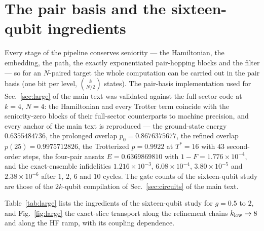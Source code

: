 \documentclass[aps,prc,reprint,superscriptaddress,floatfix,nofootinbib]{revtex4-2}
\begin{document}
\section{The pair basis and the sixteen-qubit ingredients}
\label{sm:large}
Every stage of the pipeline conserves seniority --- the Hamiltonian, the
embedding, the path, the exactly exponentiated pair-hopping blocks and the
filter --- so for an $N$-paired target the whole computation can be carried
out in the pair basis (one bit per level, $\binom{k}{N/2}$ states).  The
pair-basis implementation used for Sec.~\ref{sec:large} of the main text
was validated against the full-sector code at $k=4$, $N=4$: the Hamiltonian
and every Trotter term coincide with the seniority-zero blocks of their
full-sector counterparts to machine precision, and every anchor of the main
text is reproduced --- the ground-state energy $0.6355484736$, the prolonged
overlap $p_0=0.8676375677$, the refined overlap $p(25)=0.9975712826$, the
Trotterized $p=0.9922$ at $T^*=16$ with $43$ second-order steps, the
four-pair ansatz $E=0.6369869810$ with $1-F=1.776\times10^{-4}$, and the
exact-ensemble infidelities $1.216\times10^{-3}$, $6.08\times10^{-4}$,
$3.80\times10^{-5}$ and $2.38\times10^{-6}$ after $1$, $2$, $6$ and $10$
cycles.  The gate counts of the sixteen-qubit study are those of the
$2k$-qubit compilation of Sec.~\ref{sec:circuits} of the main text.

Table~\ref{tab:large} lists the ingredients of the sixteen-qubit study for
$g=0.5$ to $2$, and Fig.~\ref{fig:large} the exact-slice transport along
the refinement chains $k_{\rm low}\to8$ and along the HF ramp, with its
coupling dependence.
\end{document}

